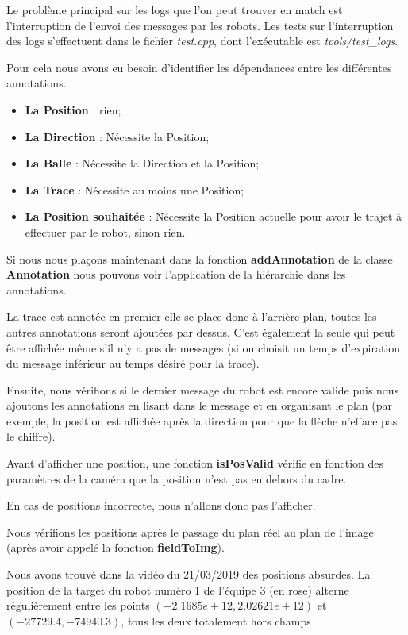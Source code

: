 Le problème principal sur les logs que l'on peut trouver en match
est l'interruption de l'envoi des messages par les robots. Les
tests sur l'interruption des logs s'effectuent dans le fichier
\textit{test.cpp}, dont l'exécutable est
\textit{tools/test\_logs}.
\bigskip

Pour cela nous avons eu besoin d'identifier les dépendances entre
les différentes annotations.

\begin{itemize}
    \item \textbf{La Position} : rien;
    \item \textbf{La Direction} : Nécessite la Position;
    \item \textbf{La Balle} : Nécessite la Direction et la
    Position;
    \item \textbf{La Trace} : Nécessite au moins une Position;
    \item \textbf{La Position souhaitée} : Nécessite la Position
    actuelle pour avoir le trajet à effectuer par le robot, sinon
    rien.
\end{itemize}
\bigskip

Si nous nous plaçons maintenant dans la fonction
\textbf{addAnnotation} de la classe \textbf{Annotation} nous
pouvons voir l'application de la hiérarchie dans les annotations.


La trace est annotée en premier elle se place donc à
l'arrière-plan, toutes les autres annotations seront ajoutées par
dessus.
C'est également la seule qui peut être affichée même s'il n'y a
pas de messages (si on choisit un temps d'expiration du message
inférieur au temps désiré pour la trace).
\bigskip

Ensuite, nous vérifions si le dernier message du robot est encore
valide puis nous ajoutons les annotations en lisant dans le
message et en organisant le plan (par exemple, la position est
affichée après la direction pour que la flèche n'efface pas le
chiffre).
\bigskip

Avant d'afficher une position, une fonction \textbf{isPosValid}
vérifie en fonction des paramètres de la caméra que la position
n'est pas en dehors du cadre. 

En cas de positions incorrecte, nous n'allons donc pas
l'afficher.
\bigskip

Nous vérifions les positions après le passage du plan réel au
plan de l'image (après avoir appelé la fonction
\textbf{fieldToImg}). 

Nous avons trouvé dans la vidéo du 21/03/2019 des positions
absurdes. La position de la target du robot numéro 1 de l'équipe
3 (en rose) alterne régulièrement entre les points $
(-2.1685e+12, 2.02621e+12)$ et $(-27729.4, -74940.3)$, tous les
deux totalement hors champs
 
